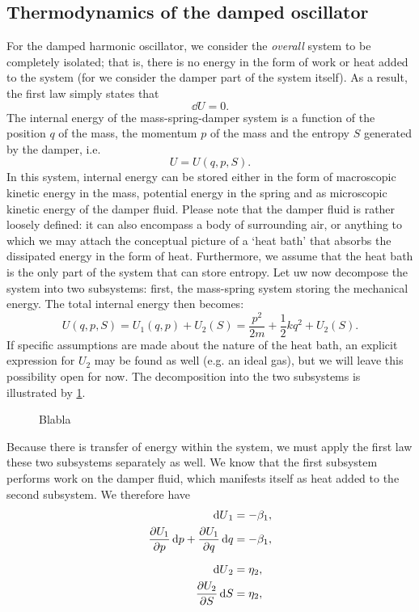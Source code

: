 \subsection{Thermodynamics of the damped oscillator}
For the damped harmonic oscillator, we consider the \emph{overall} system to be completely isolated; that is, there is no energy in the form of work or heat added to the system (for we consider the damper part of the system itself). As a result, the first law simply states that
$$ \dd{U} = 0. $$
The internal energy of the mass-spring-damper system is a function of the position $q$ of the mass, the momentum $p$ of the mass and the entropy $S$ generated by the damper, i.e.
$$ U = U(q, p, S). $$
In this system, internal energy can be stored either in the form of macroscopic kinetic energy in the mass, potential energy in the spring and as microscopic kinetic energy of the damper fluid. Please note that the damper fluid is rather loosely defined: it can also encompass a body of surrounding air, or anything to which we may attach the conceptual picture of a `heat bath' that absorbs the dissipated energy in the form of heat. Furthermore, we assume that the heat bath is the only part of the system that can store entropy. Let uw now decompose the system into two subsystems: first, the mass-spring system storing the mechanical energy. 
The total internal energy then becomes:
$$ U(q, p, S) = U_1(q, p) + U_2(S) = \frac{p^2}{2m} + \frac{1}{2}kq^2 + U_2(S). $$
If specific assumptions are made about the nature of the heat bath, an explicit expression for $U_2$ may be found as well (e.g. an ideal gas), but we will leave this possibility open for now. The decomposition into the two subsystems is illustrated by \cref{fig:oscillator_thermo}.
\begin{figure}[ht!]
    \centering
    
    \caption{Blabla}
    \label{fig:oscillator_thermo}
\end{figure}
Because there is transfer of energy within the system, we must apply the first law these two subsystems separately as well. We know that the first subsystem performs work on the damper fluid, which manifests itself as heat added to the second subsystem. We therefore have
\begin{equation}
    \begin{split}
        \dd{U}_1 &= -\beta_1, \\
        \pdv{U_1}{p}\dd{p} + \pdv{U_1}{q}\dd{q} &= -\beta_1, \\[0.2cm]
        \dd{U}_2 &= \eta_2, \\
        \pdv{U_2}{S}\dd{S} &= \eta_2, \\
    \end{split}
\end{equation}
